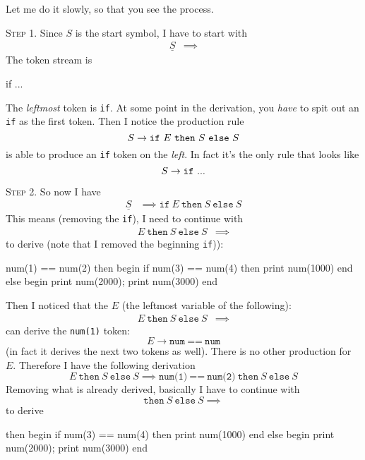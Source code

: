 Let me do it slowly, so that you see the process.

\textsc{Step 1.}
Since $S$ is the start symbol, I have to start with
\begin{align*}
  \underline{S}
  &\implies 
\end{align*}
The token stream is
\begin{console}
if ...
\end{console}
The \textit{leftmost} token is \verb!if!.
At some point in the derivation, you \textit{have} to spit out an \texttt{if} as the first token.
Then I notice the production rule
\[
S \rightarrow \texttt{if} \ E \ \texttt{then} \ S \ \texttt{else} \ S \\
\]
is able to produce an \verb!if! token on the \textit{left}.  
In fact it's the only rule that looks like
\[
S \rightarrow \texttt{if} \ ... \\
\]

\textsc{Step 2.}
So now I have
\begin{align*}
  \underline{S}
  &\implies \texttt{if} \ E \ \texttt{then} \ S \ \texttt{else} \ S 
\end{align*}
This means (removing the \texttt{if}),
I need to continue with
\begin{align*}
  E \ \texttt{then} \ S \ \texttt{else} \ S
  &\implies
\end{align*}
to derive (note that I removed the beginning \texttt{if})):
\begin{console}[commandchars=\\\{\}]
   num(1) == num(2) then
begin
    if num(3) == num(4) then
        print num(1000)
end
else
begin
    print num(2000);
    print num(3000)
end
\end{console}
Then I noticed that
the $E$ (the leftmost variable of the following):
\begin{align*}
  E \ \texttt{then} \ S \ \texttt{else} \ S
  &\implies
\end{align*}
can derive the \verb!num(1)! token:
\[
  E \rightarrow \texttt{num} \ \texttt{==} \ \texttt{num} 
\]
(in fact it derives the next two tokens as well).
There is no other production for $E$.
Therefore I have the following derivation
\[
  E \ \texttt{then} \ S \ \texttt{else} \ S
  \implies
  \texttt{num(1)} \ \texttt{==} \ \texttt{num(2)} \ \texttt{then} \ S \ \texttt{else} \ S
\]
Removing what is already derived, basically I have to continue with
\[
  \texttt{then} \ S \ \texttt{else} \ S
  \implies
\]
to derive
\begin{console}[commandchars=\\\{\}]
                    then
begin
    if num(3) == num(4) then
        print num(1000)
end
else
begin
    print num(2000);
    print num(3000)
end
\end{console}

